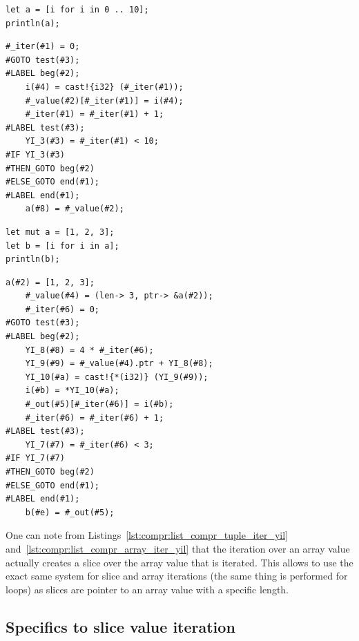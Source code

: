 \begin{lstlisting}[style=coloredverbatim, label=lst:compr:list_compr_range_iter, caption=List comprehension iterating over a range]
let a = [i for i in 0 .. 10];
println(a);
\end{lstlisting}

\begin{lstlisting}[style=lyilVerb, label=lst:compr:list_compr_range_iter_yil, caption=YIL representation of Listing~\ref{lst:compr:list_compr_range_iter}]
    #_iter(#1) = 0;
#GOTO test(#3);
#LABEL beg(#2);
    i(#4) = cast!{i32} (#_iter(#1));
    #_value(#2)[#_iter(#1)] = i(#4);
    #_iter(#1) = #_iter(#1) + 1;
#LABEL test(#3);
    YI_3(#3) = #_iter(#1) < 10;
#IF YI_3(#3)
#THEN_GOTO beg(#2)
#ELSE_GOTO end(#1);
#LABEL end(#1);
    a(#8) = #_value(#2);
\end{lstlisting}

\begin{lstlisting}[style=coloredverbatim, label=lst:compr:list_compr_array_iter, caption=List comprehension iterating over an array]
let mut a = [1, 2, 3];
let b = [i for i in a];
println(b);
\end{lstlisting}

\begin{lstlisting}[style=lyilVerb, label=lst:compr:list_compr_array_iter_yil, caption=YIL representation of Listing~\ref{lst:compr:list_compr_array_iter}]
    a(#2) = [1, 2, 3];
    #_value(#4) = (len-> 3, ptr-> &a(#2));
    #_iter(#6) = 0;
#GOTO test(#3);
#LABEL beg(#2);
    YI_8(#8) = 4 * #_iter(#6);
    YI_9(#9) = #_value(#4).ptr + YI_8(#8);
    YI_10(#a) = cast!{*(i32)} (YI_9(#9));
    i(#b) = *YI_10(#a);
    #_out(#5)[#_iter(#6)] = i(#b);
    #_iter(#6) = #_iter(#6) + 1;
#LABEL test(#3);
    YI_7(#7) = #_iter(#6) < 3;
#IF YI_7(#7)
#THEN_GOTO beg(#2)
#ELSE_GOTO end(#1);
#LABEL end(#1);
    b(#e) = #_out(#5);
\end{lstlisting}

One can note from Listings~\ref{lst:compr:list_compr_tuple_iter_yil}
and~\ref{lst:compr:list_compr_array_iter_yil} that the iteration over an array value
actually creates a slice over the array value that is iterated. This allows to
use the exact same system for slice and array iterations (the same thing is
performed for  loops) as slices are pointer to an array value with a
specific length.

\subsection{Specifics to slice value iteration}

